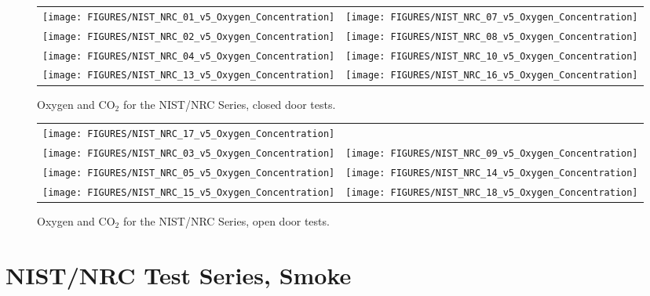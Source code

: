 \begin{figure}[p]
\begin{tabular*}{\textwidth}{l@{\extracolsep{\fill}}r}
\texttt{[image: FIGURES/NIST\_NRC\_01\_v5\_Oxygen\_Concentration]} &
\texttt{[image: FIGURES/NIST\_NRC\_07\_v5\_Oxygen\_Concentration]} \\
\texttt{[image: FIGURES/NIST\_NRC\_02\_v5\_Oxygen\_Concentration]} &
\texttt{[image: FIGURES/NIST\_NRC\_08\_v5\_Oxygen\_Concentration]} \\
\texttt{[image: FIGURES/NIST\_NRC\_04\_v5\_Oxygen\_Concentration]} &
\texttt{[image: FIGURES/NIST\_NRC\_10\_v5\_Oxygen\_Concentration]} \\
\texttt{[image: FIGURES/NIST\_NRC\_13\_v5\_Oxygen\_Concentration]} &
\texttt{[image: FIGURES/NIST\_NRC\_16\_v5\_Oxygen\_Concentration]}
\end{tabular*}
\caption{Oxygen and CO$_2$ for the NIST/NRC Series, closed door tests.}
\label{NIST_NRC_Gas_Closed}
\end{figure}

\begin{figure}[p]
\begin{tabular*}{\textwidth}{l@{\extracolsep{\fill}}r}
\texttt{[image: FIGURES/NIST\_NRC\_17\_v5\_Oxygen\_Concentration]} &
 \\
\texttt{[image: FIGURES/NIST\_NRC\_03\_v5\_Oxygen\_Concentration]} &
\texttt{[image: FIGURES/NIST\_NRC\_09\_v5\_Oxygen\_Concentration]} \\
\texttt{[image: FIGURES/NIST\_NRC\_05\_v5\_Oxygen\_Concentration]} &
\texttt{[image: FIGURES/NIST\_NRC\_14\_v5\_Oxygen\_Concentration]} \\
\texttt{[image: FIGURES/NIST\_NRC\_15\_v5\_Oxygen\_Concentration]} &
\texttt{[image: FIGURES/NIST\_NRC\_18\_v5\_Oxygen\_Concentration]}
\end{tabular*}
\caption{Oxygen and CO$_2$ for the NIST/NRC Series, open door tests.}
\label{NIST_NRC_Gas_Open}
\end{figure}

\clearpage


\section{NIST/NRC Test Series, Smoke}

